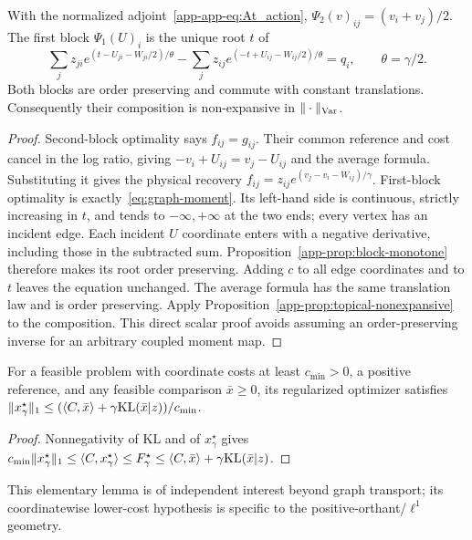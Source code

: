 \begin{proposition}\label{prop:graphw1-psi2-closed-nonexp}
With the normalized adjoint~\eqref{app-app-eq:At_action}, $\Psi_2(v)_{ij}=(v_i+v_j)/2$. The first block $\Psi_1(U)_i$ is the unique root $t$ of
\begin{equation}\label{eq:graph-moment}
 \sum_j z_{ji}e^{(t-U_{ji}-W_{ji}/2)/\theta}
 -\sum_j z_{ij}e^{(-t+U_{ij}-W_{ij}/2)/\theta}=q_i,
 \qquad\theta=\gamma/2.
\end{equation}
Both blocks are order preserving and commute with constant translations. Consequently their composition is non-expansive in $\|\cdot\|_{\rm Var}$.
\end{proposition}
\begin{proof}
Second-block optimality says $f_{ij}=g_{ij}$. Their common reference and cost cancel in the log ratio, giving $-v_i+U_{ij}=v_j-U_{ij}$ and the average formula. Substituting it gives the physical recovery $f_{ij}=z_{ij}e^{(v_j-v_i-W_{ij})/\gamma}$. First-block optimality is exactly~\eqref{eq:graph-moment}. Its left-hand side is continuous, strictly increasing in $t$, and tends to $-\infty,+\infty$ at the two ends; every vertex has an incident edge. Each incident $U$ coordinate enters with a negative derivative, including those in the subtracted sum. Proposition~\ref{app-prop:block-monotone} therefore makes its root order preserving. Adding $c$ to all edge coordinates and to $t$ leaves the equation unchanged. The average formula has the same translation law and is order preserving. Apply Proposition~\ref{app-prop:topical-nonexpansive} to the composition. This direct scalar proof avoids assuming an order-preserving inverse for an arbitrary coupled moment map.
\end{proof}

\begin{lemma}\label{app-lem:l1-bound-from-feasible}
For a feasible problem with coordinate costs at least $c_{\min}>0$, a positive reference, and any feasible comparison $\bar x\geq0$, its regularized optimizer satisfies
$\|x_\gamma^\star\|_1\leq(\langle C,\bar x\rangle+\gamma\mathrm{KL}(\bar x|z))/c_{\min}$.
\end{lemma}
\begin{proof}
Nonnegativity of KL and of $x_\gamma^\star$ gives
$c_{\min}\|x_\gamma^\star\|_1\leq\langle C,x_\gamma^\star\rangle\leq F_\gamma^\star\leq\langle C,\bar x\rangle+\gamma\mathrm{KL}(\bar x|z)$.
\end{proof}
This elementary lemma is of independent interest beyond graph transport; its coordinatewise lower-cost hypothesis is specific to the positive-orthant/$\ell^1$ geometry.

